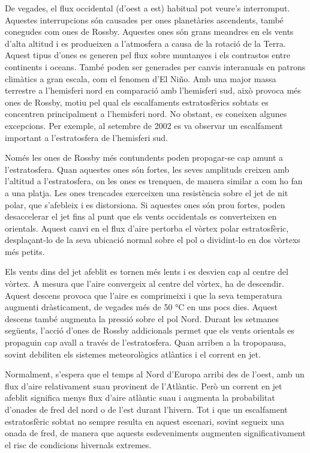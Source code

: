 \documentclass[12,twoside]{TFG-GM}
\theoremstyle{definition}
\theoremstyle{remark}
\begin{document}
De vegades, el flux occidental (d'oest a est) habitual pot veure’s interromput. Aquestes interrupcions són causades per ones planetàries ascendents, també conegudes com ones de Rossby. Aquestes ones són grans meandres en els vents d’alta altitud i es produeixen a l’atmosfera a causa de la rotació de la Terra. Aquest tipus d’ones es generen pel flux sobre muntanyes i els contrastos entre continents i oceans. També poden ser generades per canvis interanuals en patrons climàtics a gran escala, com el fenomen d’El Niño. Amb una major massa terrestre a l’hemisferi nord en comparació amb l’hemisferi sud, això provoca més ones de Rossby, motiu pel qual els escalfaments estratosfèrics sobtats es concentren principalment a l’hemisferi nord. No obstant, es coneixen algunes excepcions. Per exemple, al setembre de 2002 es va observar un escalfament important a l’estratosfera de l’hemisferi sud.

Només les ones de Rossby més contundents poden propagar-se cap amunt a l'estratosfera. Quan aquestes ones són fortes, les seves amplituds creixen amb l’altitud a l’estratosfera, on les ones es trenquen, de manera similar a com ho fan a una platja. Les ones trencades exerceixen una resistència sobre el jet de nit polar, que s’afebleix i es distorsiona. Si aquestes ones són prou fortes, poden desaccelerar el jet fins al punt que els vents occidentals es converteixen en orientals. Aquest canvi en el flux d’aire pertorba el vòrtex polar estratosfèric, desplaçant-lo de la seva ubicació normal sobre el pol o dividint-lo en dos vòrtexs més petits.

Els vents dins del jet afeblit es tornen més lents i es desvien cap al centre del vòrtex. A mesura que l’aire convergeix al centre del vòrtex, ha de descendir. Aquest descens provoca que l’aire es comprimeixi i que la seva temperatura augmenti dràsticament, de vegades més de 50 °C en uns pocs dies. Aquest descens també augmenta la pressió sobre el pol Nord. Durant les setmanes següents, l’acció d’ones de Rossby addicionals permet que els vents orientals es propaguin cap avall a través de l’estratosfera. Quan arriben a la tropopausa, sovint debiliten els sistemes meteorològics atlàntics i el corrent en jet.

Normalment, s'espera que el temps al Nord d'Europa arribi des de l’oest, amb un flux d’aire relativament suau provinent de l’Atlàntic. Però un corrent en jet afeblit significa menys flux d’aire atlàntic suau i augmenta la probabilitat d’onades de fred del nord o de l’est durant l’hivern. Tot i que un escalfament estratosfèric sobtat no sempre resulta en aquest escenari, sovint segueix una onada de fred, de manera que aquests esdeveniments augmenten significativament el risc de condicions hivernals extremes.
\end{document}
